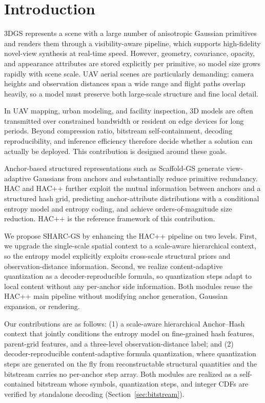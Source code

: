 \documentclass[conference]{IEEEtran}
\begin{document}
\section{Introduction}
3DGS represents a scene with a large number of anisotropic Gaussian
primitives and renders them through a visibility-aware pipeline,
which supports high-fidelity novel-view synthesis at real-time speed. However,
geometry, covariance, opacity, and appearance attributes are stored
explicitly per primitive, so model size grows rapidly with scene scale.
UAV aerial scenes are particularly demanding: camera heights and
observation distances span a wide range and flight paths overlap
heavily, so a model must preserve both large-scale structure and fine
local detail.

In UAV mapping, urban modeling, and facility inspection, 3D models are
often transmitted over constrained bandwidth or resident on edge devices
for long periods. Beyond compression ratio, bitstream self-containment,
decoding reproducibility, and inference efficiency therefore decide
whether a solution can actually be deployed. This contribution is
designed around these goals.

Anchor-based structured representations such as Scaffold-GS
\cite{lu2024} generate view-adaptive Gaussians from anchors and
substantially reduce primitive redundancy. HAC \cite{chen2024} and HAC++
\cite{chen2025} further exploit the mutual information between anchors
and a structured hash grid, predicting anchor-attribute distributions
with a conditional entropy model and entropy coding, and achieve
orders-of-magnitude size reduction. HAC++ is the reference framework of
this contribution.

We propose SHARC-GS by enhancing the HAC++ pipeline on two levels.
First, we upgrade the single-scale spatial context to a scale-aware
hierarchical context, so the entropy model explicitly exploits
cross-scale structural priors and observation-distance information.
Second, we realize content-adaptive quantization as a
decoder-reproducible formula, so quantization steps adapt to local
content without any per-anchor side information. Both modules reuse the
HAC++ main pipeline without modifying anchor generation, Gaussian
expansion, or rendering.

Our contributions are as follows: (1) a scale-aware hierarchical
Anchor--Hash context that jointly conditions the entropy model on
fine-grained hash features, parent-grid features, and a three-level
observation-distance label; and (2) decoder-reproducible
content-adaptive formula quantization, where quantization steps are
generated on the fly from reconstructable structural quantities and the
bitstream carries no per-anchor step array. Both modules are realized as
a self-contained bitstream whose symbols, quantization steps, and
integer CDFs are verified by standalone decoding (Section~\ref{sec:bitstream}).
\end{document}
